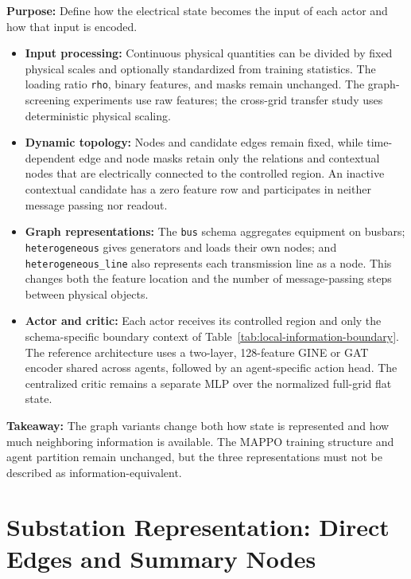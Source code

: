 \begin{tcolorbox}[
  colframe=red!75!black,
  colback=red!5!white,
  title=Chapter Summary (1/3): Graph Construction and Model
]
\textbf{Purpose:} Define how the electrical state becomes the input of each
actor and how that input is encoded.

\begin{itemize}
  \item \textbf{Input processing:} Continuous physical quantities can be
  divided by fixed physical scales and optionally standardized from training
  statistics. The loading ratio \texttt{rho}, binary features, and masks remain
  unchanged. The graph-screening experiments use raw features; the cross-grid
  transfer study uses deterministic physical scaling.
  \item \textbf{Dynamic topology:} Nodes and candidate edges remain fixed, while
  time-dependent edge and node masks retain only the relations and contextual
  nodes that are electrically connected to the controlled region. An inactive
  contextual candidate has a zero feature row and participates in neither
  message passing nor readout.
  \item \textbf{Graph representations:} The \texttt{bus} schema aggregates
  equipment on busbars; \texttt{heterogeneous} gives generators and loads their
  own nodes; and \texttt{heterogeneous\_line} also represents each transmission
  line as a node. This changes both the feature location and the number of
  message-passing steps between physical objects.
  \item \textbf{Actor and critic:} Each actor receives its controlled region and
  only the schema-specific boundary context of
  Table~\ref{tab:local-information-boundary}. The reference architecture uses a two-layer,
  128-feature GINE or GAT encoder shared across agents, followed by an
  agent-specific action head. The centralized critic remains a separate MLP
  over the normalized full-grid flat state.
\end{itemize}

\textbf{Takeaway:} The graph variants change both how state is represented and
how much neighboring information is available. The MAPPO training structure
and agent partition remain unchanged, but the three representations must not be
described as information-equivalent.
\end{tcolorbox}

\section{Substation Representation: Direct Edges and Summary Nodes}
\label{sec:substation-representation}

